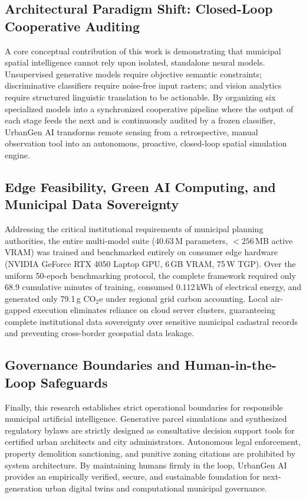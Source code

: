 \documentclass[journal]{IEEEtran}
\begin{document}
\subsection{Architectural Paradigm Shift: Closed-Loop Cooperative Auditing}
A core conceptual contribution of this work is demonstrating that municipal spatial intelligence cannot rely upon isolated, standalone neural models. Unsupervised generative models require objective semantic constraints; discriminative classifiers require noise-free input rasters; and vision analytics require structured linguistic translation to be actionable. By organizing six specialized models into a synchronized cooperative pipeline where the output of each stage feeds the next and is continuously audited by a frozen classifier, UrbanGen AI transforms remote sensing from a retrospective, manual observation tool into an autonomous, proactive, closed-loop spatial simulation engine.

\subsection{Edge Feasibility, Green AI Computing, and Municipal Data Sovereignty}
Addressing the critical institutional requirements of municipal planning authorities, the entire multi-model suite (40.63\,M parameters, $<256$\,MB active VRAM) was trained and benchmarked entirely on consumer edge hardware (NVIDIA GeForce RTX 4050 Laptop GPU, 6\,GB VRAM, 75\,W TGP). Over the uniform 50-epoch benchmarking protocol, the complete framework required only 68.9 cumulative minutes of training, consumed 0.112\,kWh of electrical energy, and generated only 79.1\,g CO$_2$e under regional grid carbon accounting. Local air-gapped execution eliminates reliance on cloud server clusters, guaranteeing complete institutional data sovereignty over sensitive municipal cadastral records and preventing cross-border geospatial data leakage.

\subsection{Governance Boundaries and Human-in-the-Loop Safeguards}
Finally, this research establishes strict operational boundaries for responsible municipal artificial intelligence. Generative parcel simulations and synthesized regulatory bylaws are strictly designed as consultative decision support tools for certified urban architects and city administrators. Autonomous legal enforcement, property demolition sanctioning, and punitive zoning citations are prohibited by system architecture. By maintaining humans firmly in the loop, UrbanGen AI provides an empirically verified, secure, and sustainable foundation for next-generation urban digital twins and computational municipal governance.
\end{document}
